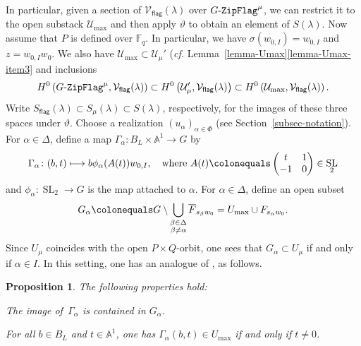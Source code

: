 \documentclass[11pt]{amsart}
\numberwithin{equation}{section}
\newtheorem{proposition}[theorem]{Proposition}
\theoremstyle{definition}
\theoremstyle{remark}
\newcommand{\flag}{\mathsf{flag}}
\newcommand{\GF}{\mathop{\text{$G$-{\tt ZipFlag}}}\nolimits}
\newcommand{\Ucal}{{\mathcal U}}
\newcommand{\Vcal}{{\mathcal V}}
\renewcommand{\AA}{\mathbb{A}}
\newcommand{\FF}{\mathbb{F}}
\DeclareMathOperator{\SL}{SL}
\newcommand{\cf}{{\em cf. }}
\begin{document}
In particular, given a section of $\Vcal_{\flag}(\lambda)$ over $\GF^{\mu}$, we can restrict it to the open substack $\Ucal_{\max}$ and then apply $\vartheta$ to obtain an element of $S(\lambda)$. Now assume  that $P$ is defined over $\FF_q$. In particular, we have $\sigma(w_{0,I})=w_{0,I}$ and $z=w_{0,I}w_0$. We also have $\Ucal_{\max}\subset \Ucal_{\mu}'$ (\cf Lemma~\ref{lemma-Umax}\eqref{lemma-Umax-item3} and inclusions
\begin{equation}\label{equ-injection-spaces}
H^0\left(\GF^{\mu},\Vcal_{\flag}(\lambda)\right)\subset H^0\left(\Ucal_{\mu}',\Vcal_{\flag}(\lambda)\right) \subset H^0\left(\Ucal_{\max},\Vcal_{\flag}(\lambda)\right).
\end{equation}
Write $S_{\flag}(\lambda) \subset S_{\mu}(\lambda) \subset S(\lambda)$, respectively, for the images of these three spaces under $\vartheta$. Choose a realization
$(u_{\alpha})_{\alpha \in \Phi}$ (see Section~\ref{subsec-notation}). For $\alpha\in \Delta$, define a map $\Gamma_\alpha \colon B_L\times \AA^1\to G$ by
\[
\Gamma_\alpha \colon (b,t)\longmapsto b \phi_\alpha(A(t))w_{0,I}, \quad \textrm{where } 
A(t) \colonequals \left(\begin{matrix}
t&1\\-1&0
\end{matrix} \right)\in \SL_2
\]
and $\phi_{\alpha}\colon \SL_2\to G$ is the map attached to $\alpha$. For $\alpha\in \Delta$, define an open subset 
\begin{equation}
G_\alpha \colonequals G\setminus \bigcup_{\substack{\beta\in \Delta\\ \beta\neq \alpha}} \overline{F}_{s_{\beta} w_0} =U_{\max}\cup F_{s_\alpha w_{0}}.    
\end{equation}
Since $U_\mu$ coincides with the open $P\times Q$-orbit, one sees that $G_\alpha\subset U_{\mu}$ if and only if $\alpha \in I$. 
In this setting, one has an analogue of \cite[Proposition 3.1.4]{Imai-Koskivirta-vector-bundles}, as follows. 

\begin{proposition}\label{psiadapted}
The following properties hold: 
\begin{assertionlist}
\item \label{item-imagepsi} The image of\, $\Gamma_\alpha$ is contained in $G_\alpha$.
\item \label{item-psit} For all $b\in B_L$ and $t\in \AA^1$, one has $\Gamma_\alpha(b,t)\in U_{\max}$ if and only if $t\neq 0$.
\end{assertionlist}
\end{proposition}
\end{document}
